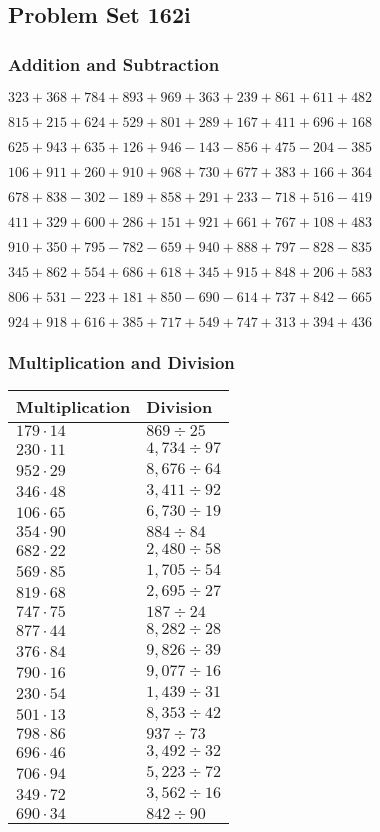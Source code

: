 \hypertarget{problem-set-162i}{%
\subsection{Problem Set 162i}\label{problem-set-162i}}

\hypertarget{addition-and-subtraction}{%
\subsubsection{Addition and
Subtraction}\label{addition-and-subtraction}}

\(323 +368 +784 +893 +969 +363 +239 +861 +611 +482\)

\(815 +215 +624 +529 +801 +289 +167 +411 +696 +168\)

\(625 +943 +635 +126 +946 - 143 - 856 +475 - 204 - 385\)

\(106 +911 +260 +910 +968 +730 +677 +383 +166 +364\)

\(678 +838 - 302 - 189 +858 +291 +233 - 718 +516 - 419\)

\(411 +329 +600 +286 +151 +921 +661 +767 +108 +483\)

\(910 +350 +795 - 782 - 659 +940 +888 +797 - 828 - 835\)

\(345 +862 +554 +686 +618 +345 +915 +848 +206 +583\)

\(806 +531 - 223 +181 +850 - 690 - 614 +737 +842 - 665\)

\(924 +918 +616 +385 +717 +549 +747 +313 +394 +436\)

\hypertarget{multiplication-and-division}{%
\subsubsection{Multiplication and
Division}\label{multiplication-and-division}}

\begin{longtable}[]{@{}ll@{}}
\toprule
Multiplication & Division\tabularnewline
\midrule
\endhead
\(179 \cdot 14\) & \(869÷25\)\tabularnewline
\(230 \cdot 11\) & \(4,734÷97\)\tabularnewline
\(952 \cdot 29\) & \(8,676÷64\)\tabularnewline
\(346 \cdot 48\) & \(3,411÷92\)\tabularnewline
\(106 \cdot 65\) & \(6,730÷19\)\tabularnewline
\(354 \cdot 90\) & \(884÷84\)\tabularnewline
\(682 \cdot 22\) & \(2,480÷58\)\tabularnewline
\(569 \cdot 85\) & \(1,705÷54\)\tabularnewline
\(819 \cdot 68\) & \(2,695÷27\)\tabularnewline
\(747 \cdot 75\) & \(187÷24\)\tabularnewline
\(877 \cdot 44\) & \(8,282÷28\)\tabularnewline
\(376 \cdot 84\) & \(9,826÷39\)\tabularnewline
\(790 \cdot 16\) & \(9,077÷16\)\tabularnewline
\(230 \cdot 54\) & \(1,439÷31\)\tabularnewline
\(501 \cdot 13\) & \(8,353÷42\)\tabularnewline
\(798 \cdot 86\) & \(937÷73\)\tabularnewline
\(696 \cdot 46\) & \(3,492÷32\)\tabularnewline
\(706 \cdot 94\) & \(5,223÷72\)\tabularnewline
\(349 \cdot 72\) & \(3,562÷16\)\tabularnewline
\(690 \cdot 34\) & \(842÷90\)\tabularnewline
\bottomrule
\end{longtable}
